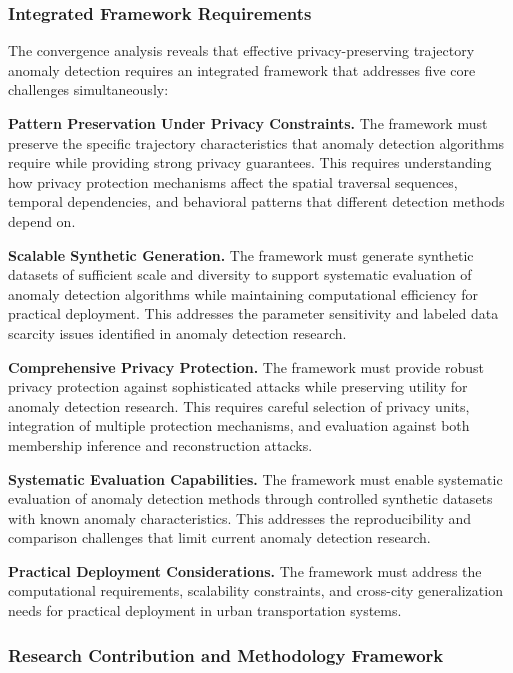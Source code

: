 \subsubsection{Integrated Framework Requirements}

The convergence analysis reveals that effective privacy-preserving trajectory anomaly detection requires an integrated framework that addresses five core challenges simultaneously:

\textbf{Pattern Preservation Under Privacy Constraints.} The framework must preserve the specific trajectory characteristics that anomaly detection algorithms require while providing strong privacy guarantees. This requires understanding how privacy protection mechanisms affect the spatial traversal sequences, temporal dependencies, and behavioral patterns that different detection methods depend on.

\textbf{Scalable Synthetic Generation.} The framework must generate synthetic datasets of sufficient scale and diversity to support systematic evaluation of anomaly detection algorithms while maintaining computational efficiency for practical deployment. This addresses the parameter sensitivity and labeled data scarcity issues identified in anomaly detection research.

\textbf{Comprehensive Privacy Protection.} The framework must provide robust privacy protection against sophisticated attacks while preserving utility for anomaly detection research. This requires careful selection of privacy units, integration of multiple protection mechanisms, and evaluation against both membership inference and reconstruction attacks.

\textbf{Systematic Evaluation Capabilities.} The framework must enable systematic evaluation of anomaly detection methods through controlled synthetic datasets with known anomaly characteristics. This addresses the reproducibility and comparison challenges that limit current anomaly detection research.

\textbf{Practical Deployment Considerations.} The framework must address the computational requirements, scalability constraints, and cross-city generalization needs for practical deployment in urban transportation systems.

\subsubsection{Research Contribution and Methodology Framework}

